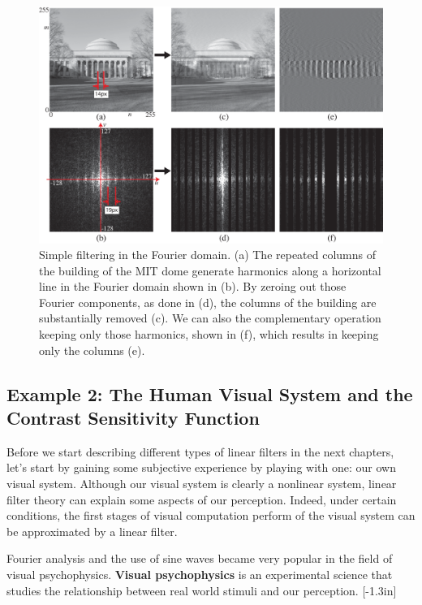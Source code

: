 \begin{figure}[t]
	\centerline{
		\includegraphics[width=1\linewidth]{figures/Image_processing_fourier/mit_columns.eps}}
	\caption{Simple filtering in the Fourier domain.  (a) The repeated columns of the
		building of the MIT dome generate harmonics along a horizontal line
		in the Fourier domain shown in (b). By zeroing out those Fourier
		components, as done in (d), the columns of the building are substantially removed (c). We can also the complementary operation keeping only those harmonics, shown in (f), which results in keeping only the columns (e).
	}
	\label{fig:filteringFT}
\end{figure}


\subsection{Example 2: The Human Visual System and the Contrast Sensitivity Function}

Before we start describing different types of linear filters in the next chapters, let's start by gaining some subjective experience by playing with one: our own visual system. Although our visual system is clearly a nonlinear system, linear filter theory can explain some aspects of our perception. Indeed, under certain conditions, the first stages of visual computation perform of the visual system can be approximated by a linear filter.

Fourier analysis and the use of sine waves became very popular in the field of visual psychophysics. {\bf Visual psychophysics}
is an experimental science that studies the relationship between real world stimuli and our perception.
[-1.3in]

